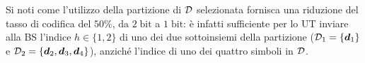 

Si noti come l'utilizzo della partizione di \(\mathcal{D}\) selezionata fornisca
una riduzione del tasso di codifica del \(50\%\), da \(2\;\mathrm{bit}\) a
\(1\;\mathrm{bit}\): è infatti sufficiente per lo UT inviare alla BS l'indice
$h \in \{1,2\}$ di uno dei due sottoinsiemi della partizione ($\mathcal{D}_1 =
\{\bm{d}_1\}$ e $\mathcal{D}_2 = \{\bm{d}_2, \bm{d}_3, \bm{d}_4\}$), anziché
l'indice di uno dei quattro simboli in \(\mathcal{D}\).

